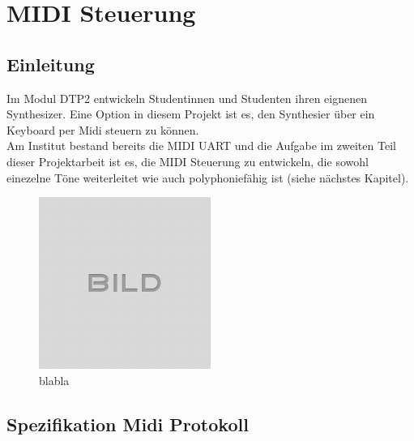 
\chapter{MIDI Steuerung}\label{chap.midi}

\section{Einleitung}\label{sect.einleitung_midi}
Im Modul DTP2 entwickeln Studentinnen und Studenten ihren eignenen Synthesizer. Eine Option in diesem Projekt ist es, den Synthesier über ein Keyboard per Midi steuern zu können. \\
Am Institut bestand bereits die MIDI UART und die Aufgabe im zweiten Teil dieser Projektarbeit ist es, die MIDI Steuerung zu entwickeln, die sowohl einezelne Töne weiterleitet wie auch polyphoniefähig ist (siehe nächstes Kapitel). \\

\begin{figure}[H]
	\centering
	\includegraphics[width=0.5\textwidth]{images/idle.png}
	\caption{blabla}
	\label{fig.bluetooth_}
\end{figure}


\section{Spezifikation Midi Protokoll}\label{sect.midi_spezification}



